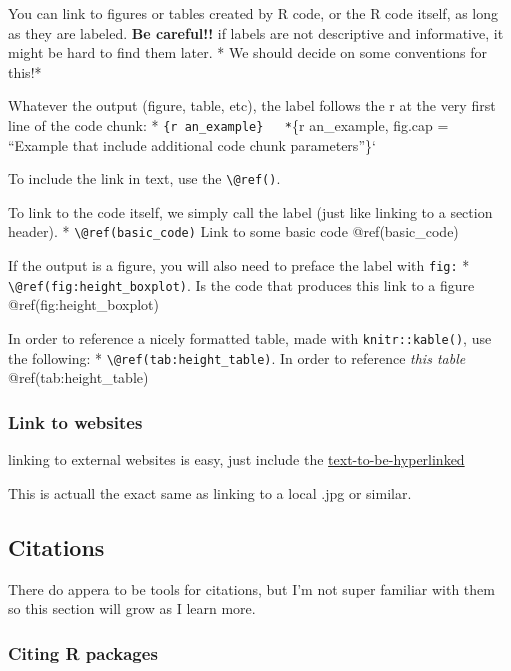 \documentclass[
]{book}
\begin{document}
You can link to figures or tables created by R code, or the R code itself, as long as they are labeled.
\textbf{Be careful!!} if labels are not descriptive and informative, it might be hard to find them later.
* We should decide on some conventions for this!*

Whatever the output (figure, table, etc), the label follows the r at the very first line of the code chunk:
* \texttt{\{r\ an\_example\}\textasciigrave{}\ \ \ *}\{r an\_example, fig.cap = ``Example that include additional code chunk parameters''\}`

To include the link in text, use the \texttt{\textbackslash{}@ref()}.

To link to the code itself, we simply call the label (just like linking to a section header).
* \texttt{\textbackslash{}@ref(basic\_code)} Link to some basic code @ref(basic\_code)

If the output is a figure, you will also need to preface the label with \texttt{fig:}
* \texttt{\textbackslash{}@ref(fig:height\_boxplot)}. Is the code that produces this link to a figure @ref(fig:height\_boxplot)

In order to reference a nicely formatted table, made with \texttt{knitr::kable()}, use the following:
* \texttt{\textbackslash{}@ref(tab:height\_table)}. In order to reference \emph{this table} @ref(tab:height\_table)

\hypertarget{link-to-websites}{%
\subsubsection{Link to websites}\label{link-to-websites}}

linking to external websites is easy, just include the \href{https://ehrlichd.github.io/ipumsEDbook}{text-to-be-hyperlinked}

This is actuall the exact same as linking to a local .jpg or similar.

\hypertarget{citations}{%
\subsection{Citations}\label{citations}}

There do appera to be tools for citations, but I'm not super familiar with them so this section will grow as I learn more.

\hypertarget{citing-r-packages}{%
\subsubsection{Citing R packages}\label{citing-r-packages}}
\end{document}
